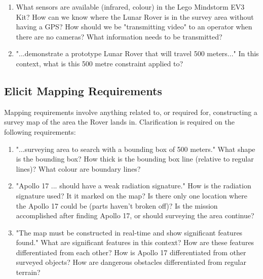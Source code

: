 \documentclass[11pt, a4paper]{article}
\begin{document}
\begin{flushleft}
  \begin{enumerate}
  
  \item What sensors are available (infrared, colour) in the Lego Mindstorm EV3 Kit?
  \linebreak How can we know where the Lunar Rover is in the survey area without having a GPS?
  \linebreak How should we be "transmitting video" to an operator when there are no cameras? What information needs to be transmitted?
  
  \item "...demonstrate a prototype Lunar Rover that will travel 500 meters..." 
  \linebreak In this context, what is this 500 metre constraint applied to?
  
  \end{enumerate}
  
  
  \subsection{Elicit Mapping Requirements}
  Mapping requirements involve anything related to, or required for, constructing a survey map of the area the Rover lands in. Clarification is required on the following requirements: 
  
  \begin{enumerate}
  
  \item "...surveying area to search with a bounding box of 500 meters."
  \linebreak What shape is the bounding box?
  \linebreak How thick is the bounding box line (relative to regular lines)?
  \linebreak What colour are boundary lines?
  
  \item "Apollo 17 ... should have a weak radiation signature."
  \linebreak How is the radiation signature used? It it marked on the map?
  \linebreak Is there only one location where the Apollo 17 could be (parts haven't broken off)?
  \linebreak Is the mission accomplished after finding Apollo 17, or should surveying the area continue?
  
  \item "The map must be constructed in real-time and show significant features found."
  \linebreak What are significant features in this context?
  \linebreak How are these features differentiated from each other?
  \linebreak How is Apollo 17 differentiated from other surveyed objects?
  \linebreak How are dangerous obstacles differentiated from regular terrain?
  

\end{enumerate}
\end{flushleft}
\end{document}
